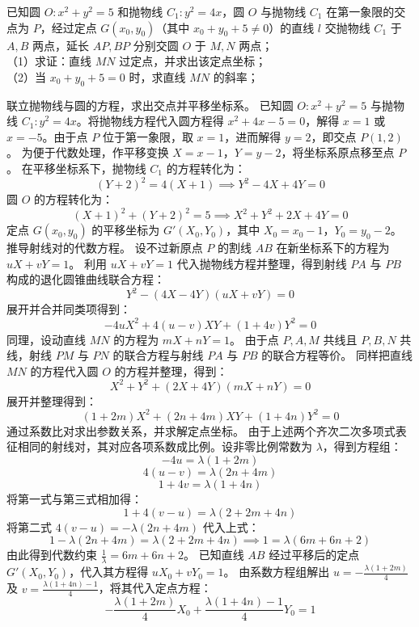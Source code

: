 \begin{example}
已知圆 \(O: x^2 + y^2 = 5\) 和抛物线 \(C_1: y^2 = 4x\)，圆 \(O\) 与抛物线 \(C_1\) 在第一象限的交点为 \(P\)，经过定点 \(G(x_0,y_0)\)（其中 \(x_0 + y_0 + 5 \neq 0\)）的直线 \(l\) 交抛物线 \(C_1\) 于 \(A,B\) 两点，延长 \(AP,BP\) 分别交圆 \(O\) 于 \(M,N\) 两点；\\
（1）求证：直线 \(MN\) 过定点，并求出该定点坐标；\\
（2）当 \(x_0 + y_0 + 5 = 0\) 时，求直线 \(MN\) 的斜率；
\end{example}
\begin{solution}
联立抛物线与圆的方程，求出交点并平移坐标系。
已知圆 $O: x^2 + y^2 = 5$ 与抛物线 $C_1: y^2 = 4x$。将抛物线方程代入圆方程得 $x^2 + 4x - 5 = 0$，解得 $x = 1$ 或 $x = -5$。由于点 $P$ 位于第一象限，取 $x = 1$，进而解得 $y = 2$，即交点 $P(1, 2)$。
为便于代数处理，作平移变换 $X = x - 1$，$Y = y - 2$，将坐标系原点移至点 $P$。
在平移坐标系下，抛物线 $C_1$ 的方程转化为：
\[ (Y+2)^2 = 4(X+1) \implies Y^2 - 4X + 4Y = 0 \]
圆 $O$ 的方程转化为：
\[ (X+1)^2 + (Y+2)^2 = 5 \implies X^2 + Y^2 + 2X + 4Y = 0 \]
定点 $G(x_0, y_0)$ 的平移坐标为 $G'(X_0, Y_0)$，其中 $X_0 = x_0 - 1$，$Y_0 = y_0 - 2$。\\
推导射线对的代数方程。
设不过新原点 $P$ 的割线 $AB$ 在新坐标系下的方程为 $uX + vY = 1$。
利用 $uX + vY = 1$ 代入抛物线方程并整理，得到射线 $PA$ 与 $PB$ 构成的退化圆锥曲线联合方程：
\[ Y^2 - (4X - 4Y)(uX + vY) = 0 \]
展开并合并同类项得到：
\[ -4u X^2 + 4(u - v)XY + (1 + 4v)Y^2 = 0 \]
同理，设动直线 $MN$ 的方程为 $mX + nY = 1$。
由于点 $P, A, M$ 共线且 $P, B, N$ 共线，射线 $PM$ 与 $PN$ 的联合方程与射线 $PA$ 与 $PB$ 的联合方程等价。
同样把直线 $MN$ 的方程代入圆 $O$ 的方程并整理，得到：
\[ X^2 + Y^2 + (2X + 4Y)(mX + nY) = 0 \]
展开并整理得到：
\[ (1 + 2m)X^2 + (2n + 4m)XY + (1 + 4n)Y^2 = 0 \]
通过系数比对求出参数关系，并求解定点坐标。
由于上述两个齐次二次多项式表征相同的射线对，其对应各项系数成比例。设非零比例常数为 $\lambda$，得到方程组：
\[ -4u = \lambda(1 + 2m) \]
\[ 4(u - v) = \lambda(2n + 4m) \]
\[ 1 + 4v = \lambda(1 + 4n) \]
将第一式与第三式相加得：
\[ 1 + 4(v - u) = \lambda(2 + 2m + 4n) \]
将第二式 $4(v - u) = -\lambda(2n + 4m)$ 代入上式：
\[ 1 - \lambda(2n + 4m) = \lambda(2 + 2m + 4n) \implies 1 = \lambda(6m + 6n + 2) \]
由此得到代数约束 $\frac{1}{\lambda} = 6m + 6n + 2$。
已知直线 $AB$ 经过平移后的定点 $G'(X_0, Y_0)$，代入其方程得 $uX_0 + vY_0 = 1$。
由系数方程组解出 $u = -\frac{\lambda(1 + 2m)}{4}$ 及 $v = \frac{\lambda(1 + 4n) - 1}{4}$，将其代入定点方程：
\[ -\frac{\lambda(1 + 2m)}{4} X_0 + \frac{\lambda(1 + 4n) - 1}{4} Y_0 = 1 \]

\end{solution}
